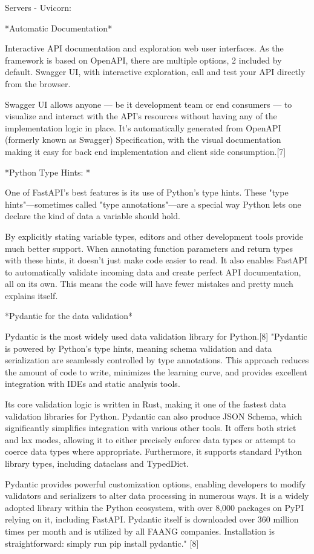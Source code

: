 Servers
- Uvicorn:

*Automatic Documentation*

Interactive API documentation and exploration web user interfaces. As the framework is based on OpenAPI, there are multiple options, 2 included by default.
Swagger UI, with interactive exploration, call and test your API directly from the browser.

Swagger UI allows anyone — be it development team or end consumers — to visualize and interact with the API’s resources without having any of the implementation logic in place. It’s automatically generated from OpenAPI (formerly known as Swagger) Specification, with the visual documentation making it easy for back end implementation and client side consumption.[7]

*Python Type Hints: *

One of FastAPI's best features is its use of Python's type hints. These "type hints"—sometimes called "type annotations"—are a special way Python lets one declare the kind of data a variable should hold.

By explicitly stating variable types, editors and other development tools provide much better support. When annotating function parameters and return types with these hints, it doesn't just make code easier to read. It also enables FastAPI to automatically validate incoming data and create perfect API documentation, all on its own. This means the code will have fewer mistakes and pretty much explains itself.

*Pydantic for the data validation*

Pydantic is the most widely used data validation library for Python.[8] "Pydantic is powered by Python's type hints, meaning schema validation and data serialization are seamlessly controlled by type annotations. This approach reduces the amount of code to write, minimizes the learning curve, and provides excellent integration with IDEs and static analysis tools.

Its core validation logic is written in Rust, making it one of the fastest data validation libraries for Python. Pydantic can also produce JSON Schema, which significantly simplifies integration with various other tools. It offers both strict and lax modes, allowing it to either precisely enforce data types or attempt to coerce data types where appropriate. Furthermore, it supports standard Python library types, including dataclass and TypedDict.

Pydantic provides powerful customization options, enabling developers to modify validators and serializers to alter data processing in numerous ways. It is a widely adopted library within the Python ecosystem, with over 8,000 packages on PyPI relying on it, including FastAPI. Pydantic itself is downloaded over 360 million times per month and is utilized by all FAANG companies. Installation is straightforward: simply run pip install pydantic." [8]


